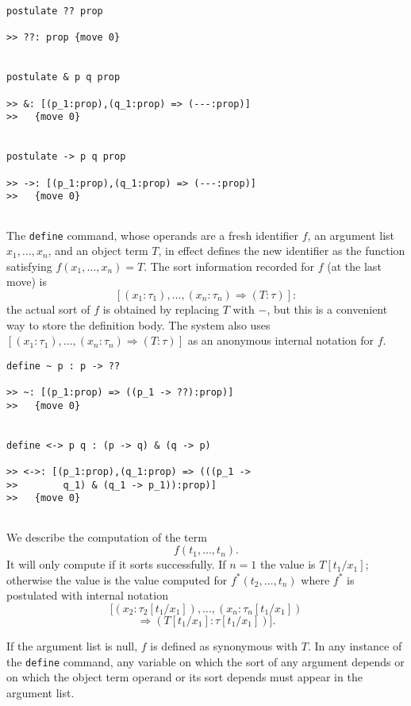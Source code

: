 \documentclass[12pt]{slides}
\begin{document}
\begin{slide}
\begin{verbatim}
postulate ?? prop

>> ??: prop {move 0}


postulate & p q prop

>> &: [(p_1:prop),(q_1:prop) => (---:prop)]
>>   {move 0}


postulate -> p q prop

>> ->: [(p_1:prop),(q_1:prop) => (---:prop)]
>>   {move 0}


\end{verbatim}

\end{slide}
\begin{slide}

The {\tt define} command, whose operands are a fresh identifier $f$, an argument list $x_1,\ldots,x_n$, and an object term $T$, in effect defines
the new identifier as the function satisfying $f(x_1,\ldots,x_n)=T$.   The sort information recorded for $f$ (at the last move) is $$[(x_1:\tau_1),\ldots,(x_n:\tau_n)\Rightarrow (T:\tau)]:$$  the actual sort of $f$ is obtained by replacing $T$ with $-$, but this is a convenient way to store the definition body.  The system also uses
$[(x_1:\tau_1),\ldots,(x_n:\tau_n)\Rightarrow (T:\tau)]$ as an anonymous internal notation for $f$.

\end{slide}
\begin{slide}
\begin{verbatim}
define ~ p : p -> ??

>> ~: [(p_1:prop) => ((p_1 -> ??):prop)]
>>   {move 0}


define <-> p q : (p -> q) & (q -> p)

>> <->: [(p_1:prop),(q_1:prop) => (((p_1 -> 
>>        q_1) & (q_1 -> p_1)):prop)]
>>   {move 0}


\end{verbatim}

\end{slide}

\begin{slide}

We describe the computation of the term $$f(t_1,\ldots,t_n).$$  It will only compute if it sorts successfully.  If $n=1$ the value is $T[t_1/x_1]$;
otherwise the value is the value computed for $f^*(t_2,\ldots,t_n)$ where $f^*$ is postulated with internal notation $$[(x_2:\tau_2[t_1/x_1]),\ldots,(x_n:\tau_n[t_1/x_1])$$ $$\Rightarrow (T[t_1/x_1]:\tau[t_1/x_1])].$$

If the argument list is null, $f$ is defined as synonymous with $T$.    In any instance of the {\tt define} command, any variable on which the sort of any argument depends or on which the object term operand or its sort depends must appear in the argument list.

\end{slide}
\end{document}

